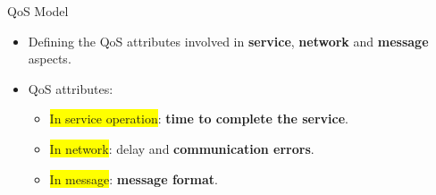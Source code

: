 \documentclass[xcolor=svgnames]{beamer}
\begin{document}

  \begin{frame}{QoS Model}
    \begin{itemize} %
	\item Defining the QoS attributes involved in \textbf{service}, \textbf{network} and \textbf{message} aspects.
	\item QoS attributes:
	    \begin{itemize}
	      \item <2->\colorbox{yellow}{In service operation}: \textbf{time to complete the service}.
	      \item <3->\colorbox{yellow}{In network}: delay and \textbf{communication errors}.
	      \item <4->\colorbox{yellow}{In message}: \textbf{message format}.
	    \end{itemize}
    \end{itemize}
  \end{frame}
\end{document}
